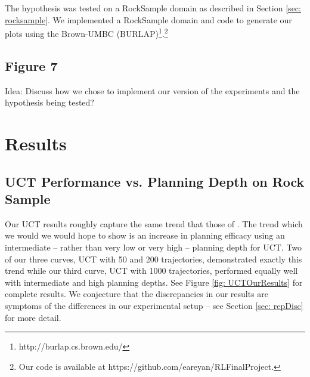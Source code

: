 \documentclass[11pt]{article} %
\begin{document}
The hypothesis was tested on a RockSample domain as described in Section \ref{sec: rocksample}. We implemented a RockSample domain and code to generate our plots using the Brown-UMBC (BURLAP)\footnote{http://burlap.cs.brown.edu/}.\footnote{Our code is available at https://github.com/eareyan/RLFinalProject.}

\subsection{Figure 7}

Idea: Discuss how we chose to implement our version of the experiments and the hypothesis being tested?

\section{Results}


\subsection{UCT Performance vs. Planning Depth on Rock Sample}
Our UCT results roughly capture the same trend that those of \cite{jiang2015dependence}. The trend which we would we would hope to show is an increase in planning efficacy using an intermediate -- rather than very low or very high -- planning depth for UCT. Two of our three curves, UCT with 50 and 200 trajectories, demonstrated exactly this trend while our third curve, UCT with 1000 trajectories, performed equally well with intermediate and high planning depths. See Figure \ref{fig: UCTOurResults} for complete results. We conjecture that the discrepancies in our results are symptoms of the differences in our experimental setup -- see Section \ref{sec: repDisc} for more detail.
\end{document}
